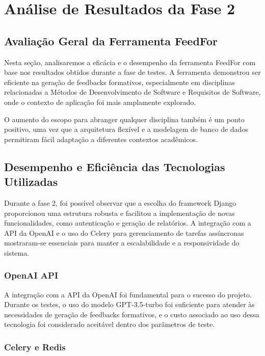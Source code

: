 \chapter{Análise de Resultados da Fase 2}

\section{Avaliação Geral da Ferramenta FeedFor}

Nesta seção, analisaremos a eficácia e o desempenho da ferramenta FeedFor com base nos resultados obtidos durante a fase de testes. A ferramenta demonstrou ser eficiente na geração de feedbacks formativos, especialmente em disciplinas relacionadas a Métodos de Desenvolvimento de Software e Requisitos de Software, onde o contexto de aplicação foi mais amplamente explorado.

O aumento do escopo para abranger qualquer disciplina também é um ponto positivo, uma vez que a arquitetura flexível e a modelagem de banco de dados permitiram fácil adaptação a diferentes contextos acadêmicos.

\section{Desempenho e Eficiência das Tecnologias Utilizadas}

Durante a fase 2, foi possível observar que a escolha do framework Django proporcionou uma estrutura robusta e facilitou a implementação de novas funcionalidades, como autenticação e geração de relatórios. A integração com a API da OpenAI e o uso do Celery para gerenciamento de tarefas assíncronas mostraram-se essenciais para manter a escalabilidade e a responsividade do sistema.

\subsection{OpenAI API}

A integração com a API da OpenAI foi fundamental para o sucesso do projeto. Durante os testes, o uso do modelo GPT-3.5-turbo foi suficiente para atender às necessidades de geração de feedbacks formativos, e o custo associado ao uso dessa tecnologia foi considerado aceitável dentro dos parâmetros de teste.

\subsection{Celery e Redis}

